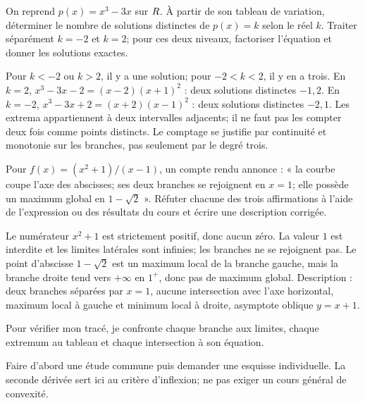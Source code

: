 \label{t11s-c05-p01}
On reprend $p(x)=x^3-3x$ sur $R$. À partir de son tableau de variation, déterminer le nombre de solutions distinctes de $p(x)=k$ selon le réel $k$. Traiter séparément $k=-2$ et $k=2$; pour ces deux niveaux, factoriser l’équation et donner les solutions exactes.
\begin{corrige}\label{sol-t11s-c05-p01}
Pour $k<-2$ ou $k>2$, il y a une solution; pour $-2<k<2$, il y en a trois. En $k=2$, $x^3-3x-2=(x-2)(x+1)^2$ : deux solutions distinctes $-1,2$. En $k=-2$, $x^3-3x+2=(x+2)(x-1)^2$ : deux solutions distinctes $-2,1$. Les extrema appartiennent à deux intervalles adjacents; il ne faut pas les compter deux fois comme points distincts. Le comptage se justifie par continuité et monotonie sur les branches, pas seulement par le degré trois.
\end{corrige}
\label{t11s-c05-p02}
Pour $f(x)=(x^2+1)/(x-1)$, un compte rendu annonce : « la courbe coupe l’axe des abscisses; ses deux branches se rejoignent en $x=1$; elle possède un maximum global en $1-\sqrt2$ ». Réfuter chacune des trois affirmations à l’aide de l’expression ou des résultats du cours et écrire une description corrigée.
\begin{corrige}\label{sol-t11s-c05-p02}
Le numérateur $x^2+1$ est strictement positif, donc aucun zéro. La valeur $1$ est interdite et les limites latérales sont infinies; les branches ne se rejoignent pas. Le point d’abscisse $1-\sqrt2$ est un maximum local de la branche gauche, mais la branche droite tend vers $+\infty$ en $1^+$, donc pas de maximum global. Description : deux branches séparées par $x=1$, aucune intersection avec l’axe horizontal, maximum local à gauche et minimum local à droite, asymptote oblique $y=x+1$.
\end{corrige}

\begin{jemeteste}Pour vérifier mon tracé, je confronte chaque branche aux limites, chaque extremum au tableau et chaque intersection à son équation.\end{jemeteste}
\begin{notepourlaclasse}Faire d’abord une étude commune puis demander une esquisse individuelle. La seconde dérivée sert ici au critère d’inflexion; ne pas exiger un cours général de convexité.\end{notepourlaclasse}
